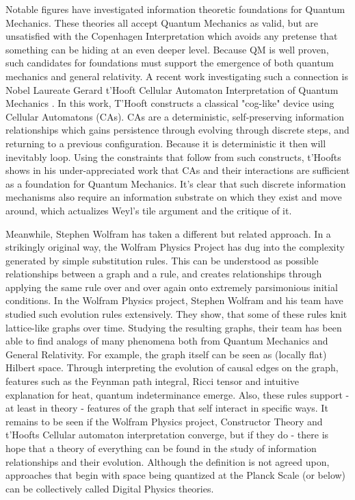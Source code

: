 \documentclass[notitlepage]{article}
\begin{document}
Notable figures have investigated information theoretic foundations for Quantum Mechanics. These theories all accept Quantum Mechanics as valid, but are unsatisfied with the Copenhagen Interpretation which avoids any pretense that something can be hiding at an even deeper level. Because QM is well proven, such candidates for foundations must support the emergence of both quantum mechanics and general relativity. A recent work investigating such a connection is Nobel Laureate Gerard t'Hooft Cellular Automaton Interpretation of Quantum Mechanics  \cite{hooft2014cellular}. In this work, T'Hooft constructs a classical "cog-like" device using Cellular Automatons (CAs). CAs are a deterministic, self-preserving information relationships which gains persistence through evolving through discrete steps, and returning to a previous configuration. Because it is deterministic it then will inevitably loop. Using the constraints that follow from such constructs, t'Hoofts shows in his under-appreciated work that CAs and their interactions are sufficient as a foundation for Quantum Mechanics. It's clear that such discrete information mechanisms also require an information substrate on which they exist and move around, which actualizes Weyl's tile argument and the critique of it.

Meanwhile, Stephen Wolfram has taken a different but related approach. In a strikingly original way, the Wolfram Physics Project \cite{Wolfram2020} has dug into the complexity generated by simple substitution rules. This can be understood as possible relationships between a graph and a rule, and creates relationships through applying the same rule over and over again onto extremely parsimonious initial conditions. In the Wolfram Physics project, Stephen Wolfram and his team have studied such evolution rules extensively. They show, that some of these rules knit lattice-like graphs over time. Studying the resulting graphs, their team has been able to find analogs of many phenomena both from Quantum Mechanics and General Relativity. For example, the graph itself can be seen as (locally flat) Hilbert space. Through interpreting the evolution of causal edges on the graph, features such as the Feynman path integral, Ricci tensor and intuitive explanation for heat, quantum indeterminance emerge. Also, these rules support - at least in theory - features of the graph that self interact in specific ways. It remains to be seen if the Wolfram Physics project, Constructor Theory and t'Hoofts Cellular automaton interpretation converge, but if they do - there is hope that a theory of everything can be found in the study of information relationships and their evolution. Although the definition is not agreed upon, approaches that begin with space being quantized at the Planck Scale (or below) can be collectively called Digital Physics theories.
\end{document}
